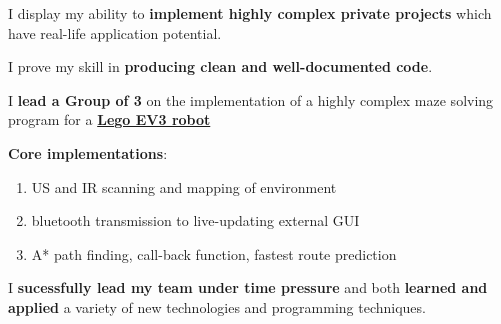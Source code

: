 \documentclass[]{jonas-cv}
\begin{document}
\begin{minipage}[t]{0.63\textwidth}
\begin{tightemize}
    \item[\faicon{angle-double-right}] I display my ability to \textbf{implement highly complex private projects} which have real-life application potential.
    \item[\faicon{angle-double-right}] I prove my skill in \textbf{producing clean and well-documented code}.
\end{tightemize}
\largesectionsep


\begin{tightemize}
   \item I \textbf{lead a Group of 3} on the implementation of a highly complex maze solving program for a \href{https://education.lego.com/en-gb/product/mindstorms-ev3}{\textbf{Lego EV3 robot}}
   \item \textbf{Core implementations}: 
   \begin{enumerate}
        \item US and IR scanning and mapping of environment
        \item bluetooth transmission to live-updating external GUI
        \item A* path finding, call-back function, fastest route prediction
   \end{enumerate}
   \vspace{1mm}

   \item[\faicon{angle-double-right}] I \textbf{sucessfully lead my team under time pressure} and both \textbf{learned and applied} a variety of new technologies and programming techniques.
\end{tightemize}



\end{minipage}
\end{document}
